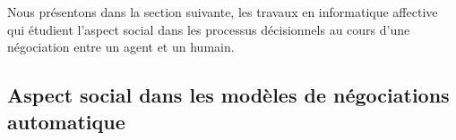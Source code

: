 		 Nous présentons dans la section suivante, les travaux en informatique affective qui étudient l'aspect social dans les processus décisionnels au cours d'une négociation entre un agent et un humain. 
		
		

		

	
	

	
	
	\subsection{Aspect social dans les modèles de négociations automatique}
	
